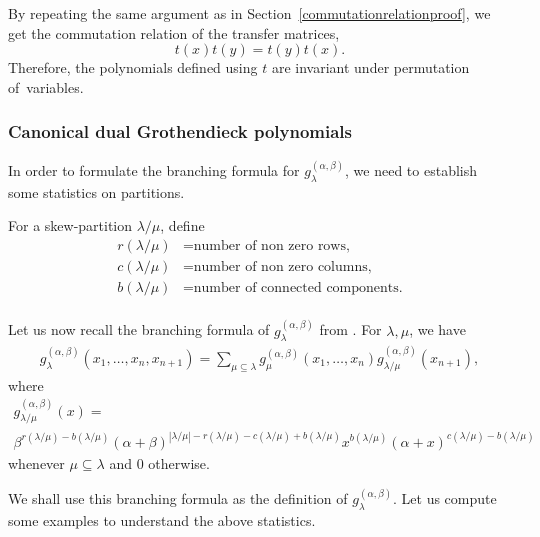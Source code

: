 \documentclass[ALCO, Unicode]{cedram}
\newcommand\g{{g^{(\alpha,\beta)}_{\lambda}}}
\begin{document}
By repeating the same argument as in Section~\ref{commutationrelationproof}, we get the commutation relation of the transfer matrices,
\[
t(x)t(y)=t(y)t(x).
\]
Therefore, the polynomials defined using $t$ are invariant under permutation of~variables.
\subsubsection{Canonical dual Grothendieck polynomials}

In order to formulate the branching formula for $\g$, we need to establish some statistics on partitions.

For a skew-partition $\lambda/\mu$, define 
\begin{align*}
r(\lambda/\mu)&= \text{number of non zero rows,}\\
c(\lambda/\mu)&= \text{number of non zero columns,}\\
b(\lambda/\mu)&= \text{number of connected components.}\\
\end{align*}

Let us now recall the branching formula of $\g$ from \cite[Theorem~8.6]{canon-groth}.
For $\lambda,\mu$, we have
\begin{align}
\label{branchg}
\g(x_1,\dots,x_n,x_{n+1})= \sum_{\mu\subseteq \lambda}  g^{(\alpha,\beta)}_{\mu}(x_1,\dots,x_n) g^{(\alpha,\beta)}_{\lambda/\mu}(x_{n+1}),
\end{align}
where
\begin{multline}
\label{singleg}
g_{\lambda/\mu}^{(\alpha,\beta)}(x)=\\
\beta^{r(\lambda/\mu)-b(\lambda/\mu)}(\alpha+\beta)^{|\lambda/\mu| - r(\lambda/\mu)-c(\lambda/\mu)+b(\lambda/\mu)} x^{b(\lambda/\mu)}{(\alpha+x)}^{c(\lambda/\mu)-b(\lambda/\mu)}
\end{multline}
whenever $\mu \subseteq \lambda$ and $0$ otherwise.

We shall use this branching formula as the definition of $\g$. 
Let us compute some examples to understand the above statistics.
\end{document}
